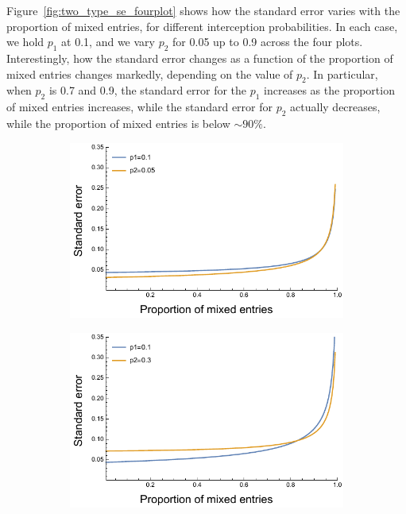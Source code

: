\documentclass{article}
\begin{document}
Figure~\ref{fig:two_type_se_fourplot} shows how the standard error varies with the proportion of mixed entries, for different interception probabilities. In each case, we hold \(p_1\) at 0.1, and we vary \(p_2\) for 0.05 up to 0.9 across the four plots. Interestingly, how the standard error changes as a function of the proportion of mixed entries changes markedly, depending on the value of \(p_2\). In particular, when \(p_2\) is 0.7 and 0.9, the standard error for the \(p_1\) increases as the proportion of mixed entries increases, while the standard error for \(p_2\) actually decreases, while the proportion of mixed entries is below \(\sim 90 \%\).



\begin{figure}[H]
\begin{subfigure}[b]{.49\textwidth}
\includegraphics[width=\textwidth]{../asymptotic_approximation/SE_twotype_p1_01_p2_005.pdf}
\end{subfigure}
\hfill
\begin{subfigure}[b]{0.49\textwidth}
\includegraphics[width=\textwidth]{../asymptotic_approximation/SE_twotype_p1_01_p2_03.pdf}

\end{subfigure}
\end{figure}
\end{document}
